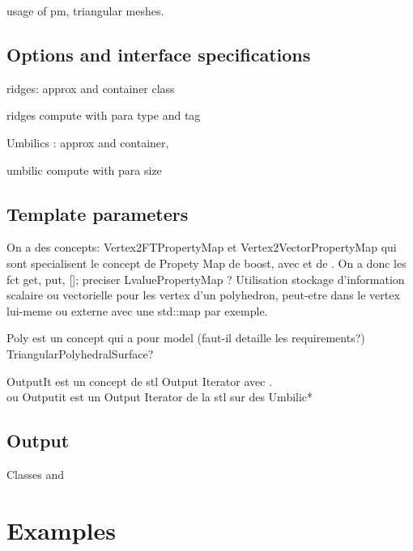 usage of pm, triangular meshes.

\subsection{Options and interface specifications}
ridges: approx and container class

ridges compute with para type and tag

Umbilics : approx and container, 

umbilic compute with para 
size

\subsection{Template parameters}

On a des concepts: Vertex2FTPropertyMap et Vertex2VectorPropertyMap
qui sont specialisent le concept de Propety Map de boost, avec
 et de . On a donc les fct get,
put, []; preciser LvaluePropertyMap ? Utilisation stockage
d'information scalaire ou vectorielle pour les vertex d'un polyhedron,
peut-etre dans le vertex lui-meme ou externe avec une std::map par
exemple. 

Poly est un concept qui a pour model  (faut-il
detaille les requirements?) TriangularPolyhedralSurface?

OutputIt est un concept de stl Output Iterator avec  .\\
ou Outputit est un Output Iterator de la stl sur des Umbilic*


\subsection{Output}

Classes  and 

\section{Examples} 
